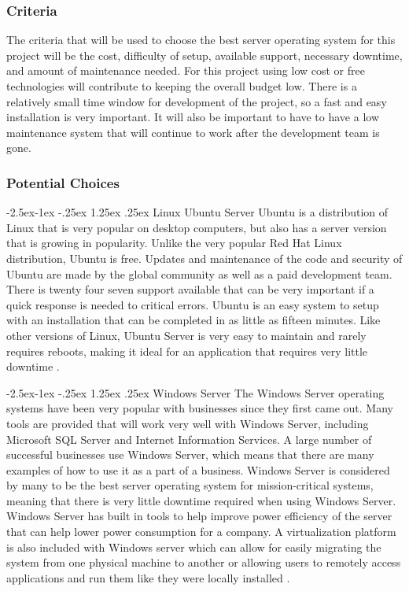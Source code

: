 \documentclass[onecolumn, draftclsnofoot,10pt, compsoc]{IEEEtran}
\makeatletter
\renewcommand\paragraph{\@startsection{paragraph}{4}{\z@}%
            {-2.5ex\@plus -1ex \@minus -.25ex}%
            {1.25ex \@plus .25ex}%
            {\normalfont\normalsize\bfseries}}
\makeatother
\begin{document}
\subsubsection{Criteria}
The criteria that will be used to choose the best server operating system for this project will be the cost, difficulty of setup, available support, necessary downtime, and amount of maintenance needed. For this project using low cost or free technologies will contribute to keeping the overall budget low. There is a relatively small time window for development of the project, so a fast and easy installation is very important. It will also be important to have to have a low maintenance system that will continue to work after the development team is gone.

\subsubsection{Potential Choices}

\paragraph{Linux Ubuntu Server}
Ubuntu is a distribution of Linux that is very popular on desktop computers, but also has a server version that is growing in popularity. Unlike the very popular Red Hat Linux distribution, Ubuntu is free. Updates and maintenance of the code and security of Ubuntu are made by the global community as well as a paid development team. There is twenty four seven support available that can be very important if a quick response is needed to critical errors. Ubuntu is an easy system to setup with an installation that can be completed in as little as fifteen minutes. Like other versions of Linux, Ubuntu Server is very easy to maintain and rarely requires reboots, making it ideal for an application that requires very little downtime \cite{ubuntu}. 

\paragraph{Windows Server}
The Windows Server operating systems have been very popular with businesses since they first came out. Many tools are provided that will work very well with Windows Server, including Microsoft SQL Server and Internet Information Services. A large number of successful businesses use Windows Server, which means that there are many examples of how to use it as a part of a business. Windows Server is considered by many to be the best server operating system for mission-critical systems, meaning that there is very little downtime required when using Windows Server. Windows Server has built in tools to help improve power efficiency of the server that can help lower power consumption for a company. A virtualization platform is also included with Windows server which can allow for easily migrating the system from one physical machine to another or allowing users to remotely access applications and run them like they were locally installed \cite{windows}.
\end{document}
